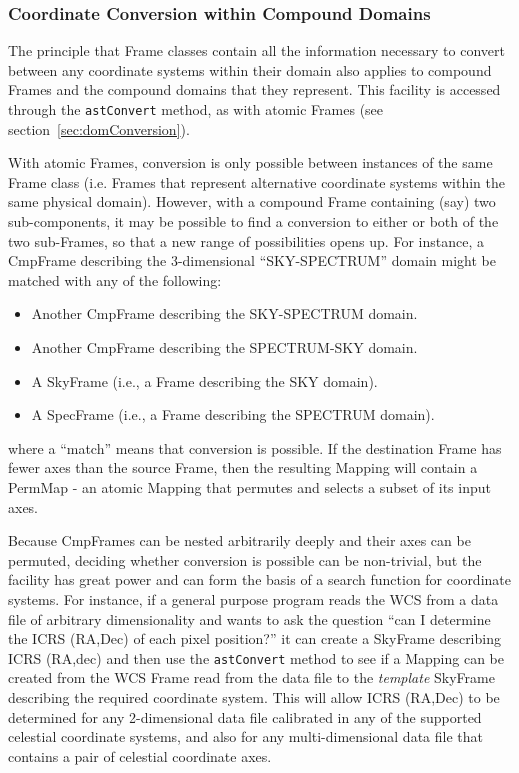 \documentclass[final,authoryear,5p,times,twocolumn]{elsarticle}
\begin{document}
\subsubsection{Coordinate Conversion within Compound Domains}
\label{sec:comConversion}
The principle that Frame classes contain all the information necessary to
convert between any coordinate systems within their domain also applies
to compound Frames and the compound domains that they represent. This
facility is accessed through the \texttt{astConvert} method, as with atomic Frames
(see section~\ref{sec:domConversion}).

With atomic Frames, conversion is only possible between instances of the
same Frame class (i.e. Frames that represent alternative coordinate
systems within the same physical domain). However, with a compound Frame
containing (say) two sub-components, it may be possible to find a
conversion to either or both of the two sub-Frames, so that a new range
of possibilities opens up. For instance, a CmpFrame describing the
3-dimensional ``SKY-SPECTRUM'' domain might be matched with any of the
following:

\begin{itemize}
\item Another CmpFrame describing the SKY-SPECTRUM domain.
\item Another CmpFrame describing the SPECTRUM-SKY domain.
\item A SkyFrame (i.e., a Frame describing the SKY domain).
\item A SpecFrame (i.e., a Frame describing the SPECTRUM domain).
\end{itemize}

where a ``match'' means that conversion is possible. If the destination
Frame has fewer axes than the source Frame, then the resulting Mapping
will contain a PermMap - an atomic Mapping that permutes and selects a
subset of its input axes.

Because CmpFrames can be nested arbitrarily deeply and their axes can be
permuted, deciding whether conversion is possible can be non-trivial, but
the facility has great power and can form the basis of a search function
for coordinate systems. For instance, if a general purpose program reads
the WCS from a data file of arbitrary dimensionality and wants to ask the
question ``can I determine the ICRS (RA,Dec) of each pixel position?'' it
can create a SkyFrame describing ICRS (RA,dec) and then use the
\texttt{astConvert} method to see if a Mapping can be created from the
WCS Frame read from the data file to the \emph{template} SkyFrame
describing the required coordinate system. This will allow ICRS (RA,Dec)
to be determined for any 2-dimensional data file calibrated in any of the
supported celestial coordinate systems, and also for any multi-dimensional data
file that contains a pair of celestial coordinate axes.
\end{document}
